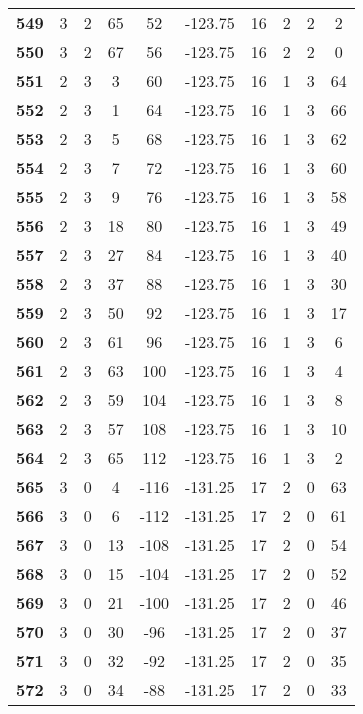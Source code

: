\documentclass{article}%
\begin{document}
\begin{longtable}{cccccccccc}
        \textbf{549} & 3 & 2 & 65 & 52 & -123.75 & 16 & 2 & 2 & 2 \\ 
        \textbf{550} & 3 & 2 & 67 & 56 & -123.75 & 16 & 2 & 2 & 0 \\ 
        \textbf{551} & 2 & 3 & 3 & 60 & -123.75 & 16 & 1 & 3 & 64 \\ 
        \textbf{552} & 2 & 3 & 1 & 64 & -123.75 & 16 & 1 & 3 & 66 \\ 
        \textbf{553} & 2 & 3 & 5 & 68 & -123.75 & 16 & 1 & 3 & 62 \\ 
        \textbf{554} & 2 & 3 & 7 & 72 & -123.75 & 16 & 1 & 3 & 60 \\ 
        \textbf{555} & 2 & 3 & 9 & 76 & -123.75 & 16 & 1 & 3 & 58 \\ 
        \textbf{556} & 2 & 3 & 18 & 80 & -123.75 & 16 & 1 & 3 & 49 \\ 
        \textbf{557} & 2 & 3 & 27 & 84 & -123.75 & 16 & 1 & 3 & 40 \\ 
        \textbf{558} & 2 & 3 & 37 & 88 & -123.75 & 16 & 1 & 3 & 30 \\ 
        \textbf{559} & 2 & 3 & 50 & 92 & -123.75 & 16 & 1 & 3 & 17 \\ 
        \textbf{560} & 2 & 3 & 61 & 96 & -123.75 & 16 & 1 & 3 & 6 \\ 
        \textbf{561} & 2 & 3 & 63 & 100 & -123.75 & 16 & 1 & 3 & 4 \\ 
        \textbf{562} & 2 & 3 & 59 & 104 & -123.75 & 16 & 1 & 3 & 8 \\ 
        \textbf{563} & 2 & 3 & 57 & 108 & -123.75 & 16 & 1 & 3 & 10 \\ 
        \textbf{564} & 2 & 3 & 65 & 112 & -123.75 & 16 & 1 & 3 & 2 \\ 
        \textbf{565} & 3 & 0 & 4 & -116 & -131.25 & 17 & 2 & 0 & 63 \\ 
        \textbf{566} & 3 & 0 & 6 & -112 & -131.25 & 17 & 2 & 0 & 61 \\ 
        \textbf{567} & 3 & 0 & 13 & -108 & -131.25 & 17 & 2 & 0 & 54 \\ 
        \textbf{568} & 3 & 0 & 15 & -104 & -131.25 & 17 & 2 & 0 & 52 \\ 
        \textbf{569} & 3 & 0 & 21 & -100 & -131.25 & 17 & 2 & 0 & 46 \\ 
        \textbf{570} & 3 & 0 & 30 & -96 & -131.25 & 17 & 2 & 0 & 37 \\ 
        \textbf{571} & 3 & 0 & 32 & -92 & -131.25 & 17 & 2 & 0 & 35 \\ 
        \textbf{572} & 3 & 0 & 34 & -88 & -131.25 & 17 & 2 & 0 & 33 \\ 

\end{longtable}
\end{document}
